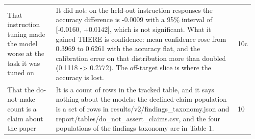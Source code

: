 \begin{longtable}{L{7.6cm}L{5.4cm}L{1.6cm}}
That instruction tuning made the model worse at the task it was tuned on & It did not: on the held-out instruction responses the accuracy difference is -0.0009 with a 95\% interval of [-0.0160, +0.0142], which is not significant. What it gained THERE is confidence: mean confidence rose from 0.3969 to 0.6261 with the accuracy flat, and the calibration error on that distribution more than doubled (0.1118 -> 0.2772). The off-target slice is where the accuracy is lost. & 10c \\
That the do-not-make count is a claim about the paper & It is a count of rows in the tracked table, and it says nothing about the models: the declined-claim population is a set of rows in results/v2/findings\_taxonomy.json and report/tables/do\_not\_assert\_claims.csv, and the four populations of the findings taxonomy are in Table 1. & 10 \\
\end{longtable}
